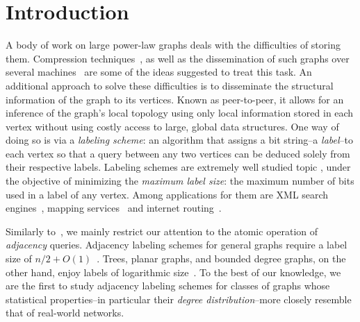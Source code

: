 

\section{Introduction}
A body of work on large power-law graphs deals with the difficulties of storing them.
Compression techniques~\cite{boldi2004webgraph,boldi2011layered}, as  well as the dissemination  of such graphs over several machines~\cite{gonzalez2012powergraph, stanton2012streaming} are some of the ideas suggested to treat this task.
An additional  approach to solve these difficulties is to disseminate the structural information of the graph to its vertices. Known as peer-to-peer, it  allows for an inference of the graph's local topology  using only local information stored in each vertex without using costly access to large, global data structures.
One way of doing so is via a \emph{ labeling scheme}: an algorithm that assigns a bit string--a \emph{label}--to each vertex so that a query between any two vertices can be deduced solely from their respective labels. 
Labeling schemes are extremely well studied topic \cite{}, under the objective of  minimizing the \emph{maximum label size}: the maximum number of bits used in a label of any vertex. Among applications for them are   XML search engines~\cite{cohen2010labeling}, mapping services~\cite{abraham2011hub} and internet routing~\cite{krioukov2004compact}.

Similarly to~\cite{}, we mainly restrict our attention to the atomic operation of \emph{adjacency} queries. 
Adjacency labeling schemes for general graphs  require a label size of $n/2+O(1)$~\cite{moon1965minimal, alstrup2014adjacency}.
Trees, planar graphs, and bounded degree graphs, on the other hand,   enjoy labels of logarithmic size~\cite{Alstrup02, gavoille2007shorter, adjiashvili2014labeling}. To the best of our knowledge, we are the first to study adjacency labeling schemes for classes of graphs whose statistical properties--in particular their \emph{degree distribution}--more closely resemble that of real-world networks.

